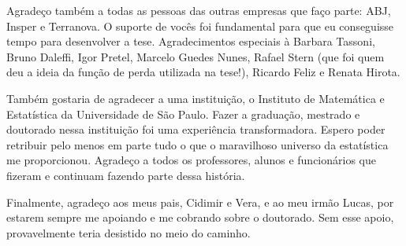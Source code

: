 \documentclass[12pt,twoside,brazilian]{book}
\begin{document}
Agradeço também a todas as pessoas das outras empresas que faço parte: ABJ, Insper e Terranova. O suporte de vocês foi fundamental para que eu conseguisse tempo para desenvolver a tese. Agradecimentos especiais à Barbara Tassoni, Bruno Daleffi, Igor Pretel, Marcelo Guedes Nunes, Rafael Stern (que foi quem deu a ideia da função de perda utilizada na tese!), Ricardo Feliz e Renata Hirota.

Também gostaria de agradecer a uma instituição, o Instituto de Matemática e Estatística da Universidade de São Paulo. Fazer a graduação, mestrado e doutorado nessa instituição foi uma experiência transformadora. Espero poder retribuir pelo menos em parte tudo o que o maravilhoso universo da estatística me proporcionou. Agradeço a todos os professores, alunos e funcionários que fizeram e continuam fazendo parte dessa história.

Finalmente, agradeço aos meus pais, Cidimir e Vera, e ao meu irmão Lucas, por estarem sempre me apoiando e me cobrando sobre o doutorado. Sem esse apoio, provavelmente teria desistido no meio do caminho.

% 




\end{document}
